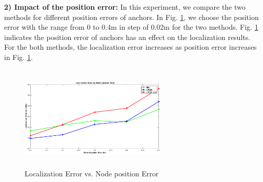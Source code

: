 \textbf{2) Impact of the position error:}
 In this experiment, we compare the two methods for different position errors of anchors. 
 In Fig. \ref{fig5}, we choose the position error with the range from 0 to 0.4m in step of 0.02m for the two methods. 
 Fig. \ref{fig5} indicates the position error of anchors has an effect on the localization results. 
 For the both methods, the localization error increases as position error increases in Fig. \ref{fig5}. 
  \begin{figure}[htb]
            \centering
		   \vspace{3mm}
			 \includegraphics[height=5.0cm,width=7.0cm]{image/locationerror.eps}
              \caption{Localization Error vs. Node position Error}
             \vspace{-5mm}
             \label{fig5}
        \end{figure}

